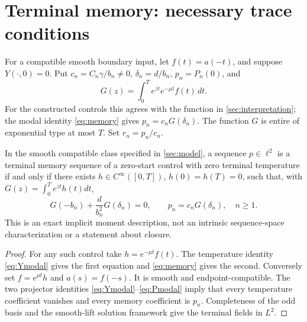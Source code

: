 \section{Terminal memory: necessary trace conditions}\label{sec:trace}
For a compatible smooth boundary input, let \(f(t)=a(-t)\), and suppose \(Y(\cdot,0)=0\). Put \(c_n=C_n\gamma/b_n\ne0\), \(\delta_n=d/b_n\), \(p_n=P_n(0)\), and
\[
G(z)=\int_0^T e^{zt}e^{-\mu t}f(t)\,dt.
\]
For the constructed controls this agrees with the function in \cref{sec:interpretation}; the modal identity \eqref{eq:memory} gives \(p_n=c_nG(\delta_n)\). The function \(G\) is entire of exponential type at most \(T\). Set \(r_n=p_n/c_n\).

\begin{proposition}\label{prop:implicit}
In the smooth compatible class specified in \cref{sec:model}, a sequence \(p\in\ell^2\) is a terminal memory sequence of a zero-start control with zero terminal temperature if and only if there exists \(h\in C^\infty([0,T])\), \(h(0)=h(T)=0\), such that, with \(G(z)=\int_0^T e^{zt}h(t)dt\),
\[
G(-b_n)+\frac{d}{b_n^2}G(\delta_n)=0,\qquad
p_n=c_nG(\delta_n),\quad n\ge1.
\]
This is an exact implicit moment description, not an intrinsic sequence-space characterization or a statement about closure.
\end{proposition}
\begin{proof}
For any such control take \(h=e^{-\mu t}f(t)\). The temperature identity \eqref{eq:Ymodal} gives the first equation and \eqref{eq:memory} gives the second. Conversely set \(f=e^{\mu t}h\) and \(a(s)=f(-s)\). It is smooth and endpoint-compatible. The two projector identities \eqref{eq:Ymodal}--\eqref{eq:Pmodal} imply that every temperature coefficient vanishes and every memory coefficient is \(p_n\). Completeness of the odd basis and the smooth-lift solution framework give the terminal fields in \(L^2\).
\end{proof}

